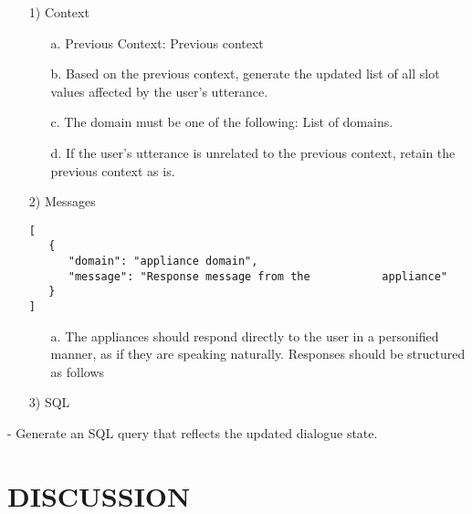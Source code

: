 \documentclass[conference]{IEEEtran}
\begin{document}
\begin{itemize}
    \item[1)] Context
    \begin{itemize}
    \item[a.] Previous Context: {Previous context} 
   \item[b.] Based on the previous context, generate the updated list of all slot values affected by the user's utterance. 
   \item[c.] The domain must be one of the following: {List of domains}.
    \item[d.] If the user's utterance is unrelated to the previous context, retain the previous context as is. \\
   \end{itemize}
\end{itemize}
   

\begin{itemize}
    \item[2)] Messages
    \begin{lstlisting}
[
   {
      "domain": "appliance domain", 
      "message": "Response message from the           appliance"
   }
]
\end{lstlisting}
    \begin{itemize}
    \item[a.] The appliances should respond directly to the user in a personified manner, as if they are speaking naturally. Responses should be structured as follows
\end{itemize}
\end{itemize} 



\begin{itemize}
    \item[3)] SQL
\end{itemize}
- Generate an SQL query that reflects the updated dialogue state. \\


\section{DISCUSSION}
\end{document}
